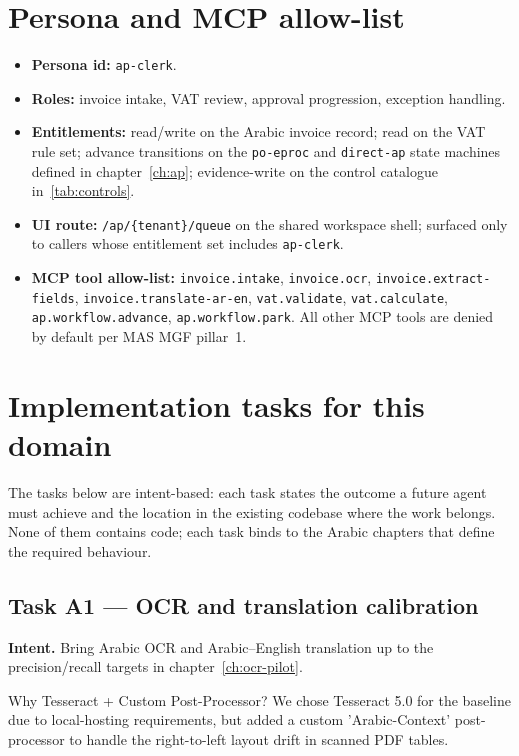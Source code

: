 \documentclass[11pt,a4paper,twoside]{report}
\begin{document}
\section{Persona and MCP allow-list}
\label{sec:agent-persona}
\begin{itemize}
  \item \textbf{Persona id:} \texttt{ap-clerk}.
  \item \textbf{Roles:} invoice intake, VAT review, approval
    progression, exception handling.
  \item \textbf{Entitlements:} read/write on the Arabic invoice
    record; read on the VAT rule set; advance transitions on the
    \texttt{po-eproc} and \texttt{direct-ap} state machines defined
    in chapter~\ref{ch:ap}; evidence-write on the control catalogue
    in~\ref{tab:controls}.
  \item \textbf{UI route:} \texttt{/ap/\{tenant\}/queue} on the shared
    workspace shell; surfaced only to callers whose entitlement set
    includes \texttt{ap-clerk}.
  \item \textbf{MCP tool allow-list:}
    \texttt{invoice.intake}, \texttt{invoice.ocr},
    \texttt{invoice.extract-fields},
    \texttt{invoice.translate-ar-en}, \texttt{vat.validate},
    \texttt{vat.calculate}, \texttt{ap.workflow.advance},
    \texttt{ap.workflow.park}. All other MCP tools are denied by
    default per MAS MGF pillar~1.
\end{itemize}

\section{Implementation tasks for this domain}
\label{sec:agent-tasks}
The tasks below are intent-based: each task states the outcome a
future agent must achieve and the location in the existing codebase
where the work belongs. None of them contains code; each task binds
to the Arabic chapters that define the required behaviour.

\subsection*{Task A1 --- OCR and translation calibration}
\textbf{Intent.} Bring Arabic OCR and Arabic--English translation up
to the precision/recall targets in chapter~\ref{ch:ocr-pilot}.

\begin{adrbox}{Why Tesseract + Custom Post-Processor?}
We chose Tesseract 5.0 for the baseline due to local-hosting requirements, but added a custom 'Arabic-Context' post-processor to handle the right-to-left layout drift in scanned PDF tables.
\end{adrbox}
\end{document}
